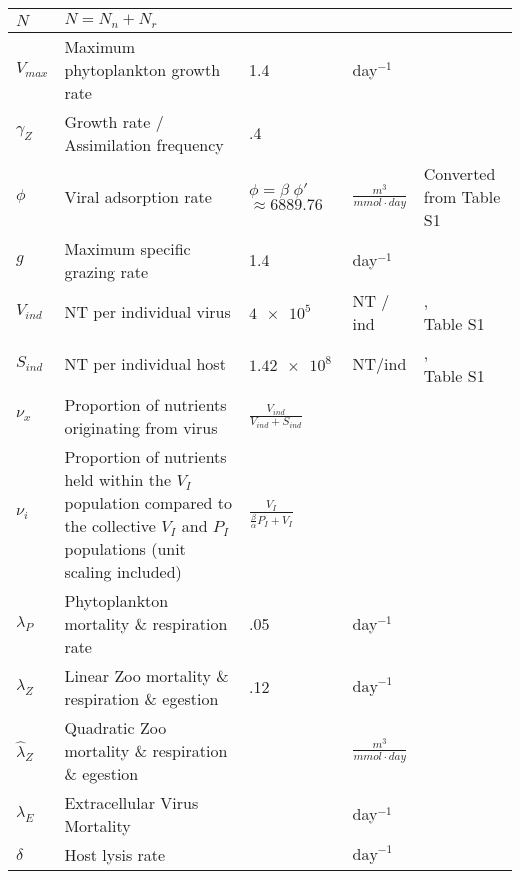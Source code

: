 \documentclass{article}
\begin{document}
\begin{table}[H]
\begin{tabular}{||l|l|l|l|l||}
        \hline
        $N$ & $N = N_n + N_r$ & & & \\
        \hline
        $V_{max}$ & Maximum phytoplankton growth rate & 1.4 & day$^{-1}$ & \cite{sarmiento_gruber_2006}\\
        \hline
        $\gamma_{Z}$ & Growth rate / Assimilation frequency & .4 & & \cite{sarmiento_gruber_2006}\\
        \hline
        $\phi$ & Viral adsorption rate & \makecell{$\phi = \beta \; \phi'$ \\ $\approx 6889.76$} & \large{$\frac{m^3}{mmol \cdot day}$} & \makecell{Converted from Table S1 \\ \cite{EhV_dyn}} \\
        \hline
        $g$ & Maximum specific grazing rate & 1.4 & \textrm{day}$^{-1}$ & \cite{sarmiento_gruber_2006}\\
        \hline
        $V_{ind}$ & NT per individual virus & $\num{4e5}$ & NT / ind & \makecell{\cite{EhV_dyn}, \\ Table S1} \\
        \hline
        $S_{ind}$ & NT per individual host & $\num{1.42e8}$ & NT/ind & \makecell{\cite{EhV_dyn}, \\ Table S1} \\
        \hline
        $\nu_{x}$ & Proportion of nutrients originating from virus & \large{$\frac{V_{ind}}{V_{ind} + S_{ind}}$} & & \cite{EhV_dyn} \\
        \hline
        $\nu_i$ & \makecell{Proportion of nutrients held within the $V_I$ population \\ compared to the collective $V_I$ and $P_I$ populations \\ (unit scaling included)} & $\displaystyle \frac{V_I}{\frac{\beta}{\alpha} P_I + V_I}$ & & \\
        \hline
        $\lambda_{P}$ & Phytoplankton mortality \& respiration rate & .05 & \textrm{day}$^{-1}$ & \cite{sarmiento_gruber_2006}\\
        \hline
        $\lambda_{Z}$ & Linear Zoo mortality \& respiration \& egestion & .12 & $\textrm{day}^{-1}$ & \cite{sarmiento_gruber_2006} \\
        \hline
        $\hat{\lambda}_{Z}$ & Quadratic Zoo mortality \& respiration \& egestion & & \large{$\frac{m^3}{mmol \cdot day}$} & \\
        \hline
        $\lambda_{E}$ & Extracellular Virus Mortality & & \textrm{day}$^{-1}$ & \\
        \hline
        $\delta$ & Host lysis rate & & $\textrm{day}^{-1}$ & \\

\end{tabular}
\end{table}
\end{document}
